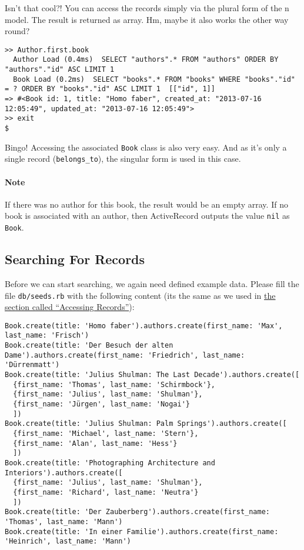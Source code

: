 \documentclass[a4paper]{book}
\begin{document}
Isn't that cool?! You can access the records simply via the plural form of the n model. The result is returned as array. Hm, maybe it also works the other way round?

\begin{shaded}\begin{verbatim}
>> Author.first.book
  Author Load (0.4ms)  SELECT "authors".* FROM "authors" ORDER BY "authors"."id" ASC LIMIT 1
  Book Load (0.2ms)  SELECT "books".* FROM "books" WHERE "books"."id" = ? ORDER BY "books"."id" ASC LIMIT 1  [["id", 1]]
=> #<Book id: 1, title: "Homo faber", created_at: "2013-07-16 12:05:49", updated_at: "2013-07-16 12:05:49">
>> exit
$
\end{verbatim}\end{shaded}

Bingo! Accessing the associated \texttt{Book} class is also very easy. And as it's only a single record (\texttt{belongs\_to}), the singular form is used in this case.

\paragraph{Note}\label{note-26}

If there was no author for this book, the result would be an empty array. If no book is associated with an author, then ActiveRecord outputs the value \texttt{nil} as \texttt{Book}.

\subsection{Searching For Records}\label{searching-for-records}

Before we can start searching, we again need defined example data. Please fill the file \texttt{db/seeds.rb} with the following content (its the same as we used in \hyperref[activerecordux5f1nux5fzugreifen]{the section called “Accessing Records”}):

\begin{shaded}\begin{verbatim}
Book.create(title: 'Homo faber').authors.create(first_name: 'Max', last_name: 'Frisch')
Book.create(title: 'Der Besuch der alten Dame').authors.create(first_name: 'Friedrich', last_name: 'Dürrenmatt')
Book.create(title: 'Julius Shulman: The Last Decade').authors.create([
  {first_name: 'Thomas', last_name: 'Schirmbock'},
  {first_name: 'Julius', last_name: 'Shulman'},
  {first_name: 'Jürgen', last_name: 'Nogai'}
  ])
Book.create(title: 'Julius Shulman: Palm Springs').authors.create([
  {first_name: 'Michael', last_name: 'Stern'},
  {first_name: 'Alan', last_name: 'Hess'}
  ])
Book.create(title: 'Photographing Architecture and Interiors').authors.create([
  {first_name: 'Julius', last_name: 'Shulman'},
  {first_name: 'Richard', last_name: 'Neutra'}
  ])
Book.create(title: 'Der Zauberberg').authors.create(first_name: 'Thomas', last_name: 'Mann')
Book.create(title: 'In einer Familie').authors.create(first_name: 'Heinrich', last_name: 'Mann')
\end{verbatim}\end{shaded}
\end{document}
